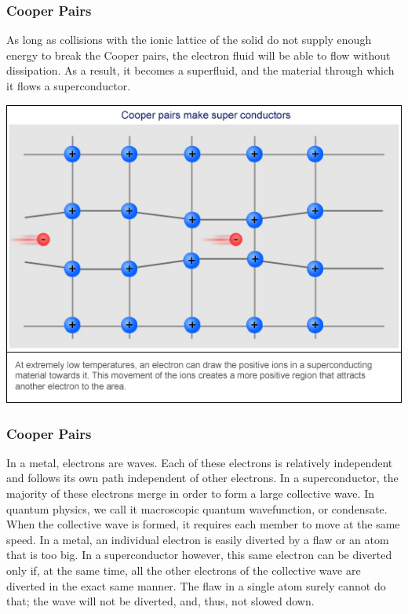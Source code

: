 \documentclass[10pt]{beamer}
\theoremstyle{definition}
\begin{document}
\begin{frame}
    \frametitle{Cooper Pairs}

    As long as collisions with the ionic lattice of the solid do not supply 
    enough energy to break the Cooper pairs, the electron fluid will be able 
    to flow without dissipation. As a result, it becomes a superfluid, and the 
    material through which it flows a superconductor.

    \begin{center}
    \includegraphics[scale = 0.3]{cooperpairs}
    \end{center}



\end{frame}


\begin{frame}
    \frametitle{Cooper Pairs}
%

    In a metal, electrons are waves. Each of these electrons is relatively independent 
    and follows its own path independent of other electrons. In a superconductor, 
    the majority of these electrons merge in order to form a large collective wave. 
    In quantum physics, we call it macroscopic quantum wavefunction, or condensate. 
    When the collective wave is formed, it requires each member to move at the same 
    speed. In a metal, an individual electron is easily diverted by a flaw or an atom 
    that is too big. In a superconductor however, this same electron can be diverted 
    only if, at the same time, all the other electrons of the collective wave are 
    diverted in the exact same manner. The flaw in a single atom surely cannot do 
    that; the wave will not be diverted, and, thus, not slowed down.



\end{frame}
\end{document}
